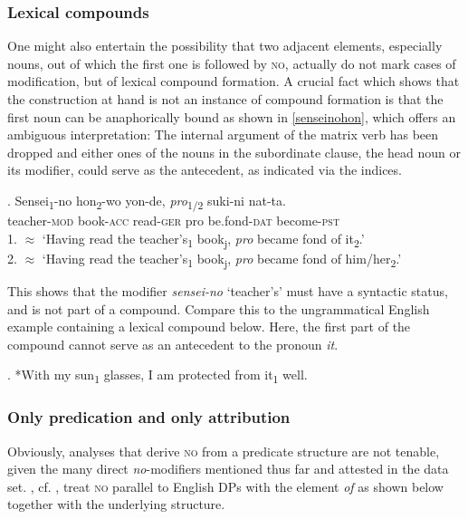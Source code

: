 \documentclass [output=book,colorlinks,citecolor=brown]{langscibook}
\begin{document}
\subsubsection{Lexical compounds}

One might also entertain the possibility that two adjacent elements, especially nouns, out of which the first one is followed by \textsc{no}, actually do not mark cases of modification, but of lexical compound formation. A crucial fact which shows that the construction at hand is not an instance of compound formation is that the first noun can be anaphorically bound as shown in \ref{senseinohon}, which offers an ambiguous interpretation: The internal argument of the matrix verb has been dropped and either ones of the nouns in the subordinate clause, the head noun or its modifier, could serve as the antecedent, as indicated via the indices.

\exg. Sensei\textsubscript{1}-no hon\textsubscript{2}-wo yon-de, \textit{pro}\textsubscript{1/2} suki-ni nat-ta.\\
teacher-\textsc{mod} book-\textsc{acc} read-\textsc{ger} pro be.fond-\textsc{dat} become-\textsc{pst}\\
1. $\approx$ `Having read the teacher’s\textsubscript{1} book\textsubscript{j}, \textit{pro} became fond of it\textsubscript{2}.’\\
2. $\approx$ `Having read the teacher’s\textsubscript{1} book\textsubscript{j}, \textit{pro} became fond of him/her\textsubscript{2}.’ \label{senseinohon}

This shows that the modifier \textit{sensei-no} `teacher’s’ must have a syntactic status, and is not part of a compound. Compare this to the ungrammatical English example containing a lexical compound below. Here, the first part of the compound cannot serve as an antecedent to the pronoun \textit{it}.

\ex. *With my sun\textsubscript{1} glasses, I am protected from it\textsubscript{1} well. \\ \null \hfill \citep[37]{rae:2010:ordering}

\subsubsection{Only predication and only attribution}

Obviously, analyses that derive \textsc{no} from a predicate structure are not tenable, given the many direct \textit{no}-modifiers mentioned thus far and attested in the data set. \citet{dikken:2004:complex}, cf. \citet{dikken:2006:relators, moro:1997:raising}, treat \textsc{no} parallel to English DPs with the element \textit{of} as shown below together with the underlying structure. %
\end{document}
